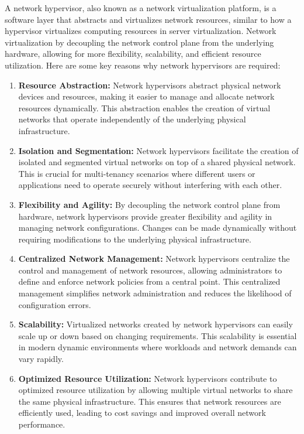 \documentclass{report}
\begin{document}
A network hypervisor, also known as a network virtualization platform, is a software layer that abstracts and virtualizes network resources, similar to how a hypervisor virtualizes computing resources in server virtualization.
Network virtualization by decoupling the network control plane from the underlying hardware, allowing for more flexibility, scalability, and efficient resource utilization.\cite{1}
Here are some key reasons why network hypervisors are required:

\begin{enumerate}
  \item \textbf{Resource Abstraction:} Network hypervisors abstract physical network devices and resources, making it easier to manage and allocate network resources dynamically.
   This abstraction enables the creation of virtual networks that operate independently of the underlying physical infrastructure.

  \item \textbf{Isolation and Segmentation:} Network hypervisors facilitate the creation of isolated and segmented virtual networks on top of a shared physical network.
   This is crucial for multi-tenancy scenarios where different users or applications need to operate securely without interfering with each other.

  \item \textbf{Flexibility and Agility:} By decoupling the network control plane from hardware, network hypervisors provide greater flexibility and agility in managing network configurations.
  Changes can be made dynamically without requiring modifications to the underlying physical infrastructure.

  \item \textbf{Centralized Network Management:} Network hypervisors centralize the control and management of network resources, allowing administrators to define and enforce network policies from a central point.
  This centralized management simplifies network administration and reduces the likelihood of configuration errors.

  \item \textbf{Scalability:} Virtualized networks created by network hypervisors can easily scale up or down based on changing requirements.
  This scalability is essential in modern dynamic environments where workloads and network demands can vary rapidly.

  \item \textbf{Optimized Resource Utilization:} Network hypervisors contribute to optimized resource utilization by allowing multiple virtual networks to share the same physical infrastructure.
  This ensures that network resources are efficiently used, leading to cost savings and improved overall network performance.\cite{2}

\end{enumerate}
\end{document}
